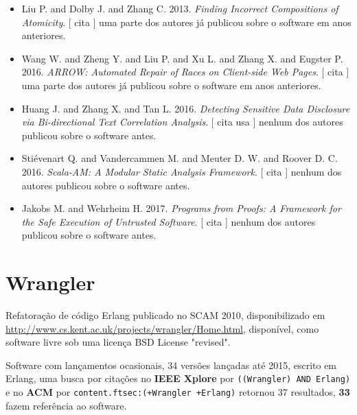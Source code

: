 \begin{itemize}
\item Liu P. and Dolby J. and Zhang C.
      2013.
        \textit{ Finding Incorrect Compositions of Atomicity}.
      [
          cita
      ]
uma parte dos autores já publicou sobre o software em anos anteriores.
\item Wang W. and Zheng Y. and Liu P. and Xu L. and Zhang X. and Eugster P.
      2016.
        \textit{ ARROW: Automated Repair of Races on Client-side Web Pages}.
      [
          cita
      ]
uma parte dos autores já publicou sobre o software em anos anteriores.
\item Huang J. and Zhang X. and Tan L.
      2016.
        \textit{ Detecting Sensitive Data Disclosure via Bi-directional Text Correlation Analysis}.
      [
          cita
          usa
      ]
nenhum dos autores publicou sobre o software antes.
\item Stiévenart Q. and Vandercammen M. and Meuter D. W. and Roover D. C.
      2016.
        \textit{ Scala-AM: A Modular Static Analysis Framework}.
      [
          cita
      ]
nenhum dos autores publicou sobre o software antes.
\item Jakobs M. and Wehrheim H.
      2017.
        \textit{ Programs from Proofs: A Framework for the Safe Execution of Untrusted Software}.
      [
          cita
      ]
nenhum dos autores publicou sobre o software antes.
\end{itemize}
\section{Wrangler}

Refatoração de código Erlang
publicado no SCAM 2010,
disponibilizado em \url{http://www.cs.kent.ac.uk/projects/wrangler/Home.html},
disponível,
como software livre
sob uma licença BSD License "revised".

Software com lançamentos ocasionais,
34 versões lançadas
até 2015,
escrito em Erlang,
uma busca por citações no {\bf IEEE Xplore} por
\texttt{((Wrangler) AND Erlang)}
e no {\bf ACM} por
\texttt{content.ftsec:(+Wrangler +Erlang)}
retornou
37 resultados,
{\bf 33} fazem referência ao software.


